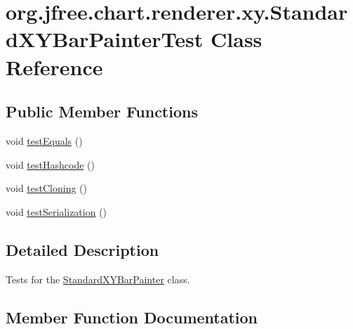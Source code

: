 \hypertarget{classorg_1_1jfree_1_1chart_1_1renderer_1_1xy_1_1_standard_x_y_bar_painter_test}{}\section{org.\+jfree.\+chart.\+renderer.\+xy.\+Standard\+X\+Y\+Bar\+Painter\+Test Class Reference}
\label{classorg_1_1jfree_1_1chart_1_1renderer_1_1xy_1_1_standard_x_y_bar_painter_test}
\subsection*{Public Member Functions}
\begin{DoxyCompactItemize}
\item 
void \mbox{\hyperlink{classorg_1_1jfree_1_1chart_1_1renderer_1_1xy_1_1_standard_x_y_bar_painter_test_aa4fbb999a64e4a2db459437c907304ef}{test\+Equals}} ()
\item 
void \mbox{\hyperlink{classorg_1_1jfree_1_1chart_1_1renderer_1_1xy_1_1_standard_x_y_bar_painter_test_ada12ccd63dd0b5e487e51eaa14950612}{test\+Hashcode}} ()
\item 
void \mbox{\hyperlink{classorg_1_1jfree_1_1chart_1_1renderer_1_1xy_1_1_standard_x_y_bar_painter_test_a4661f7cf63550c9144ea4324e31a220c}{test\+Cloning}} ()
\item 
void \mbox{\hyperlink{classorg_1_1jfree_1_1chart_1_1renderer_1_1xy_1_1_standard_x_y_bar_painter_test_a14de78d9d96483ac34389bbb361e86cd}{test\+Serialization}} ()
\end{DoxyCompactItemize}


\subsection{Detailed Description}
Tests for the \mbox{\hyperlink{classorg_1_1jfree_1_1chart_1_1renderer_1_1xy_1_1_standard_x_y_bar_painter}{Standard\+X\+Y\+Bar\+Painter}} class. 

\subsection{Member Function Documentation}
\mbox{\label{classorg_1_1jfree_1_1chart_1_1renderer_1_1xy_1_1_standard_x_y_bar_painter_test_a4661f7cf63550c9144ea4324e31a220c}} 
